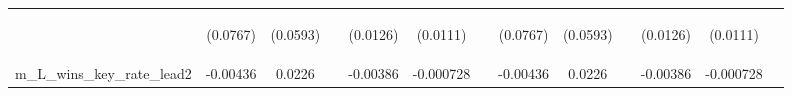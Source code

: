 \documentclass[]{article}
\begin{document}
\begin{center}
\begin{tabular}{lcccccccccccc}
\vspace{4pt} & \begin{footnotesize}(0.0767)\end{footnotesize} & \begin{footnotesize}(0.0593)\end{footnotesize} & \begin{footnotesize}\end{footnotesize} & \begin{footnotesize}(0.0126)\end{footnotesize} & \begin{footnotesize}(0.0111)\end{footnotesize} & \begin{footnotesize}\end{footnotesize} & \begin{footnotesize}(0.0767)\end{footnotesize} & \begin{footnotesize}(0.0593)\end{footnotesize} & \begin{footnotesize}\end{footnotesize} & \begin{footnotesize}(0.0126)\end{footnotesize} & \begin{footnotesize}(0.0111)\end{footnotesize} & \begin{footnotesize}\end{footnotesize} \\
m\_L\_wins\_key\_rate\_lead2 & -0.00436 & 0.0226 &  & -0.00386 & -0.000728 &  & -0.00436 & 0.0226 &  & -0.00386 & -0.000728 &  \\

\end{tabular}
\end{center}
\end{document}
